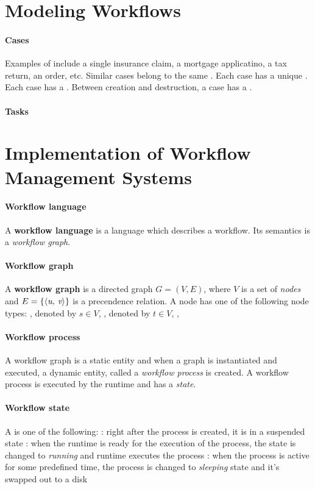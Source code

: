\documentclass{myart}
\begin{document}
\small


\section{Modeling Workflows}
\paragraph{Cases}
\bit
\w Examples of  include a single insurance claim, a mortgage
applicatino, a tax return, an order, etc. 
\w Similar cases belong to the same .
\w Each case has a unique . 
\w Each case has a .
\w Between creation and destruction, a case has a .
\eit

\paragraph{Tasks}
\bit
\w 
\eit

\section{Implementation of Workflow Management Systems}


\paragraph{Workflow language} A {\bf workflow language} is a language which
describes a workflow. Its semantics is a {\em workflow graph}.

\paragraph{Workflow graph} A {\bf workflow graph\/} is a directed graph $G =
(V, E)$, where $V$ is a set of {\em nodes} and $E = \{\mbox{$\langle{\textit{u, v}}\rangle$}\}$ is a
precendence relation.
A {node} has one of the following node types:
  \bit
  , denoted by $s \in V$,
  , denoted by $t \in V$,
  ,
  \eit

\paragraph{Workflow process}
A workflow graph is a static entity and when a graph is instantiated and
executed, a dynamic entity, called a {\em workflow process\/} is created.
A {\bb workflow process} is executed by the runtime and has a {\em state\/}. 

\paragraph{Workflow state}
A  is one of the following:
\bit
{}: right after the process is created, it is in a suspended
state 
: when the runtime is ready for the execution of the process, the
state is changed to {\em running\/} and runtime executes the process
: when the process is active for some predefined time, the
process is changed to {\em sleeping\/} state and it's swapped out to a disk
\eit
\end{document}
